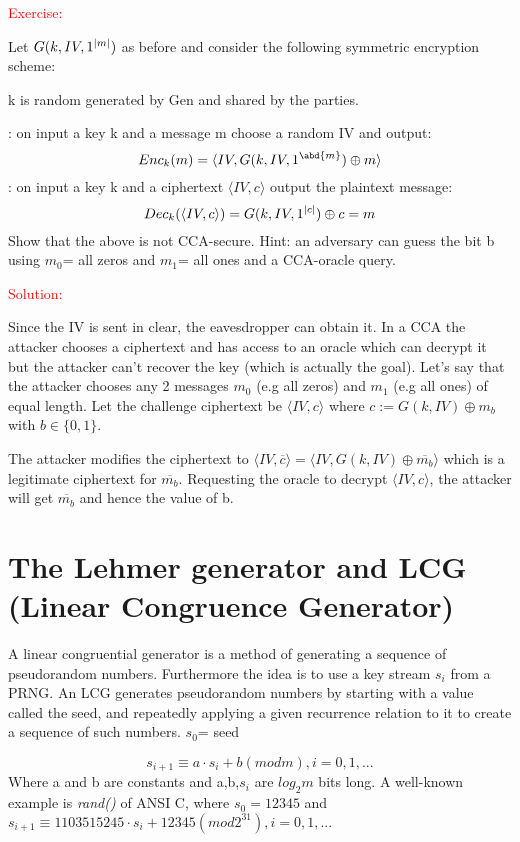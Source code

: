 \documentclass{article}
\newcommand*\xor{\mathbin{\oplus}}
\begin{document}
\textcolor{red}{Exercise:}


Let $G(k,IV,1^{\abs{m}})$ as before and consider the following symmetric encryption scheme:

k is random generated by Gen and shared by the parties.

: on input a key k and a message m choose a random IV and output:
\begin{equation*}
    Enc_k(m)=\langle IV,G(k,IV,1^{\abd{m}}) \xor m \rangle
\end{equation*}
: on input a key k and a ciphertext $\langle IV,c \rangle$ output the plaintext message:
\begin{equation*}
    Dec_k(\langle IV,c \rangle)=G(k,IV,1^{\abs{c}}) \xor c=m
\end{equation*}
Show that the above is not CCA-secure. Hint: an adversary can guess the bit b using $m_0$= all zeros and $m_1$= all ones and a CCA-oracle query.

\textcolor{red}{Solution:}


Since the IV is sent in clear, the eavesdropper can obtain it. In a CCA the attacker chooses a ciphertext and has access to an oracle which can decrypt it but the attacker can't recover the key (which is actually the goal).
Let's say that the attacker chooses any 2 messages $m_0$ (e.g all zeros) and $m_1$ (e.g all ones) of equal length.
Let the challenge ciphertext be $\langle IV,c \rangle$ where $c:=G(k,IV)\xor m_b$ with $b \in \{0,1\}$.

The attacker modifies the ciphertext to $\langle IV,\overline{ c}\rangle = \langle IV,G(k,IV)\xor \overline{m_b}\rangle$ which is a legitimate ciphertext for $\overline{m_b}$. Requesting the oracle to decrypt $\langle IV,c\rangle$, the attacker will get $\overline{m_b}$ and hence the value of b.

\section{The Lehmer generator and LCG (Linear Congruence Generator)}
A linear congruential generator is a method of generating a sequence of pseudorandom numbers. Furthermore the idea is to use a key stream $s_i$ from a PRNG. An LCG generates pseudorandom numbers by starting with a value called the seed, and repeatedly applying a given recurrence relation to it to create a sequence of such numbers. 
$s_0$= seed

\begin{equation*}
    s_{i+1} \equiv a\cdot s_i + b(mod m), i=0,1,...
\end{equation*}
Where a and b are constants and a,b,$s_i$ are $log_2m$ bits long.
A well-known example is \textit{rand()} of ANSI C, where $s_0 = 12345$ and $s_{i+1} \equiv 1103515245 \cdot s_i + 12345(mod 2^31), i=0,1,...$
    
\end{document}
